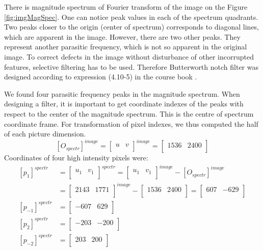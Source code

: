 \documentclass[11pt]{article}
\numberwithin{equation}{section}
\begin{document}
There is magnitude spectrum of Fourier transform of the image on the Figure \ref{fig:imgMagSpec}. One can notice peak values in each of the spectrum quadrants. Two peaks closer to the origin (center of spectrum) corresponds to diagonal lines, which are apparent in the image. However, there are two other peaks. They represent another parasitic frequency, which is not so apparent in the original image. To correct defects in the image without disturbance of other incorrupted features, selective filtering has to be used. Therefore Butterworth notch filter was designed according to expression (4.10-5) in the course book \cite{gonzwoods}.  

We found four parasitic frequency peaks in the magnitude spectrum. When designing a filter, it is important to get coordinate indexes of the peaks with respect to the center of the magnitude spectrum. This is the centre of spectrum coordinate frame. For transformation of pixel indexes, we thus computed the half of each picture dimension.
\begin{equation*}
	\left[O_{spectr}\right]^{image} =
	\begin{bmatrix}
	 u & v \\
	\end{bmatrix}^{image}
	= 
	\begin{bmatrix}
	1536 & 2400 \\
	\end{bmatrix}
\end{equation*}
Coordinates of four high intensity pixels were:
\begin{align*}
	\left[p_{1}\right]^{spectr} &= 
	\begin{bmatrix}
	u_1 & v_1 \\
	\end{bmatrix}^{spectr}
	= 
	\begin{bmatrix}
	u_1 & v_1 \\
	\end{bmatrix}^{image} - \left[O_{spectr}\right]^{image} \\
	&= \begin{bmatrix}
	2143 & 1771 \\
	\end{bmatrix}^{image}
	-
	\begin{bmatrix}
	1536 & 2400 \\
	\end{bmatrix}
	= 
	\begin{bmatrix}
	607 & -629 \\
	\end{bmatrix}
	\\
	\left[p_{-1}\right]^{spectr} &= 
	\begin{bmatrix}
	-607 & 629 \\
	\end{bmatrix}
	\\
	\left[p_{2}\right]^{spectr} &= 
	\begin{bmatrix}
	-203 & -200 \\
	\end{bmatrix}
	\\
	\left[p_{-2}\right]^{spectr} &= 
	\begin{bmatrix}
	203 & 200 \\
	\end{bmatrix}
\end{align*}
\end{document}
